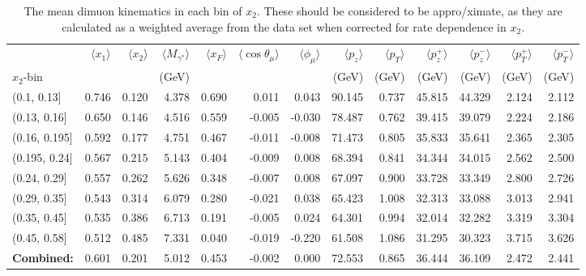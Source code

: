 \begin{table}
	\centering
	\begin{tabular}{lrrrrrrrrrrrr}
		\toprule
		{} &    $\langle x_1 \rangle$ &    $\langle x_2\rangle$ &   $\langle M_{\gamma^*}\rangle$ &     $\langle x_F\rangle$ &  $\langle \cos\theta_\mu\rangle$ &    $\langle \phi_\mu\rangle$ &     $\langle p_z\rangle$ &    $\langle p_T\rangle$ &     $\langle p_z^+\rangle$ &    $\langle p_z^-\rangle$  &    $\langle p_T^+\rangle$ &   $\langle p_T^-\rangle$  \\
		$x_2$-bin            &        &        &   (GeV)     &        &        &        &     (GeV)    &   (GeV)     &    (GeV)     &   (GeV)      &   (GeV)     &   (GeV)     \\
		\midrule
		(0.1, 0.13]   &  0.746 &  0.120 &  4.378 &  0.690 &  0.011 &  0.043 &  90.145 &  0.737 &  45.815 &  44.329 &  2.124 &  2.112 \\
		\rowcol (0.13, 0.16]  &  0.650 &  0.146 &  4.516 &  0.559 & -0.005 & -0.030 &  78.487 &  0.762 &  39.415 &  39.079 &  2.224 &  2.186 \\
		(0.16, 0.195] &  0.592 &  0.177 &  4.751 &  0.467 & -0.011 & -0.008 &  71.473 &  0.805 &  35.833 &  35.641 &  2.365 &  2.305 \\
		\rowcol (0.195, 0.24] &  0.567 &  0.215 &  5.143 &  0.404 & -0.009 &  0.008 &  68.394 &  0.841 &  34.344 &  34.015 &  2.562 &  2.500 \\
		(0.24, 0.29]  &  0.557 &  0.262 &  5.626 &  0.348 & -0.007 &  0.008 &  67.097 &  0.900 &  33.728 &  33.349 &  2.800 &  2.726 \\
		\rowcol (0.29, 0.35]  &  0.543 &  0.314 &  6.079 &  0.280 & -0.021 &  0.038 &  65.423 &  1.008 &  32.313 &  33.088 &  3.013 &  2.941 \\
		(0.35, 0.45]  &  0.535 &  0.386 &  6.713 &  0.191 & -0.005 &  0.024 &  64.301 &  0.994 &  32.014 &  32.282 &  3.319 &  3.304 \\
		\rowcol (0.45, 0.58]  &  0.512 &  0.485 &  7.331 &  0.040 & -0.019 & -0.220 &  61.508 &  1.086 &  31.295 &  30.323 &  3.715 &  3.626 \\
		\bottomrule
		\textbf{Combined:} & 0.601 &  0.201 &  5.012 &  0.453 & -0.002 & 0.000 & 72.553 &  0.865 &  36.444 &  36.109 &  2.472 & 2.441 \\
	\end{tabular}
	\caption{The mean dimuon kinematics in each bin of $x_2$. These should be considered to be appro/ximate, as they are
		calculated as a weighted average from the data set when corrected for rate dependence in $x_2$.}
	\label{tab:mean-kin-x2}
\end{table}


